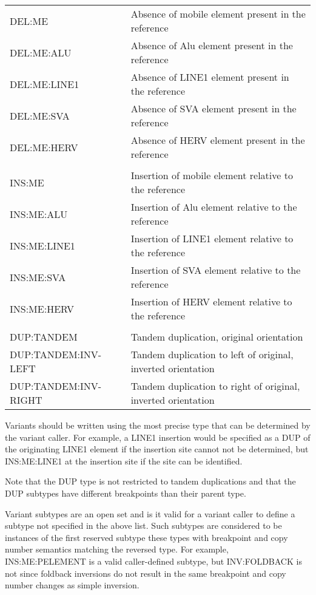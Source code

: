 \documentclass[8pt]{article}
\begin{document}
\begin{tabular}{l l}
DEL:ME  &  Absence of mobile element present in the reference \\
DEL:ME:ALU  &  Absence of Alu element present in the reference \\
DEL:ME:LINE1  &  Absence of LINE1 element present in the reference \\
DEL:ME:SVA  &  Absence of SVA element present in the reference \\
DEL:ME:HERV  &  Absence of HERV element present in the reference \\
\\
INS:ME  &  Insertion of mobile element relative to the reference \\
INS:ME:ALU  &  Insertion of Alu element relative to the reference \\
INS:ME:LINE1  &  Insertion of LINE1 element relative to the reference \\
INS:ME:SVA  &  Insertion of SVA element relative to the reference \\
INS:ME:HERV  &  Insertion of HERV element relative to the reference \\
\\
DUP:TANDEM  &  Tandem duplication, original orientation \\
DUP:TANDEM:INV-LEFT  &  Tandem duplication to left of original, inverted orientation \\
DUP:TANDEM:INV-RIGHT  &  Tandem duplication to right of original, inverted orientation \\
\end{tabular}\newline

Variants should be written using the most precise type that can be determined by the variant caller. For example, a LINE1 insertion would be specified as a DUP of the originating LINE1 element if the insertion site cannot not be determined, but INS:ME:LINE1 at the insertion site if the site can be identified.

Note that the DUP type is not restricted to tandem duplications and that the DUP subtypes have different breakpoints than their parent type.

Variant subtypes are an open set and is it valid for a variant caller to define a subtype not specified in the above list. Such subtypes are considered to be instances of the first reserved subtype these types with breakpoint and copy number semantics matching the reversed type. For example, INS:ME:PELEMENT is a valid caller-defined subtype, but INV:FOLDBACK is not since foldback inversions do not result in the same breakpoint and copy number changes as simple inversion.
\end{document}

